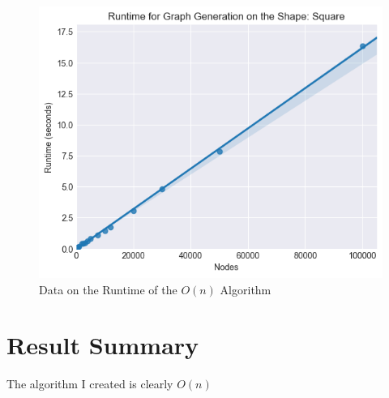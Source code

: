 \documentclass{article}
\begin{document}
  \begin{figure}[!htb]
    \centering
    \includegraphics[width=1 \textwidth]{square/runtime/runtime_chart}
    \caption{Data on the Runtime of the $O(n)$ Algorithm}
  \end{figure}

\section{Result Summary}
  The algorithm I created is clearly $O(n)$

\printbibliography
\end{document}

